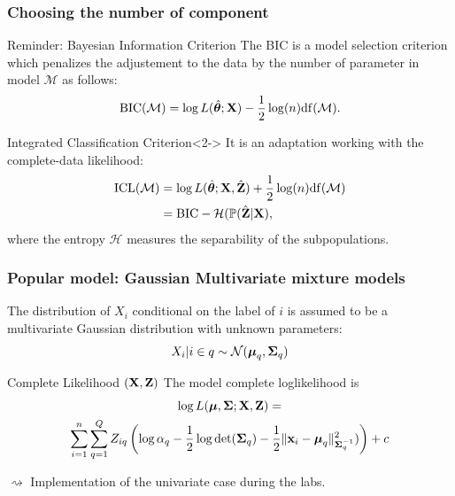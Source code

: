 \documentclass{beamer}\usepackage[]{graphicx}\usepackage[]{color}
\begin{document}
\begin{frame}
  \frametitle{Choosing the number of component}

  \begin{block}{Reminder: Bayesian Information Criterion}
    The BIC is a model selection criterion which penalizes the adjustement to the data by the number of parameter in model $\mathcal{M}$ as follows:
    \begin{equation*}
      \mathrm{BIC}(\mathcal{M}) = \log L(\,\hat{\!\boldsymbol\theta}; \mathbf{X}) - \frac{1}{2}\log(n) \mathrm{df}(\mathcal{M}).
    \end{equation*}
  \end{block}

  \vspace{-.35cm}

  \begin{block}{Integrated Classification Criterion}<2->
    It is an adaptation working with the complete-data likelihood:
    \vspace{-.25cm}
    \begin{align*}
      \mathrm{ICL}(\mathcal{M}) & = \log L(\,\hat{\!\boldsymbol\theta}; \mathbf{X}, \hat{\mathbf{Z}}) + \frac{1}{2}\log(n) \mathrm{df}(\mathcal{M}) \\
      & = \mathrm{BIC} - \mathcal{H}(\mathbb{P}(\hat {\mathbf{Z}} | \mathbf{X}),
    \end{align*}
    where the entropy $\mathcal{H}$ measures the separability of the subpopulations.
  \end{block}

  \vfill

\end{frame}

\begin{frame}
  \frametitle{Popular model: Gaussian Multivariate mixture models}

  The distribution of $X_i$ conditional on the label of $i$ is assumed to be a multivariate Gaussian distribution with unknown parameters:
  \begin{equation*}
  X_i | i \in q \sim \mathcal{N}(\boldsymbol{\mu}_q,\boldsymbol{\Sigma}_q)
  \end{equation*}

  \begin{block}{Complete Likelihood $(\mathbf{X},\mathbf{Z})$}
  The model complete loglikelihood is
    \begin{multline*}
        \log L(\boldsymbol{\mu},\boldsymbol{\Sigma}; \mathbf{X}, \mathbf{Z})  = \\ \sum_{i=1}^n \sum_{q=1}^Q Z_{iq} \left(\log \alpha_q - \frac{1}{2}\log\mathrm{det}(\boldsymbol{\Sigma}_q) - \frac{1}{2} \|\mathbf{x}_i - \boldsymbol{\mu}_q\|^2_{\boldsymbol{\Sigma}_q^{-1}}) \right) + c
   \end{multline*}
  \end{block}
  

  $\rightsquigarrow$ Implementation of the univariate case during the labs.
\end{frame}
\end{document}
